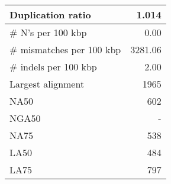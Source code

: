 \documentclass[12pt,a4paper]{article}
\begin{document}
\begin{table}[ht]
\begin{center}
\begin{tabular}{|l*{1}{|r}|}
Duplication ratio & 1.014 \\ \hline
\# N's per 100 kbp & 0.00 \\ \hline
\# mismatches per 100 kbp & 3281.06 \\ \hline
\# indels per 100 kbp & 2.00 \\ \hline
Largest alignment & 1965 \\ \hline
NA50 & 602 \\ \hline
NGA50 & - \\ \hline
NA75 & 538 \\ \hline
LA50 & 484 \\ \hline
LA75 & 797 \\ \hline
\end{tabular}
\end{center}
\end{table}
\end{document}
